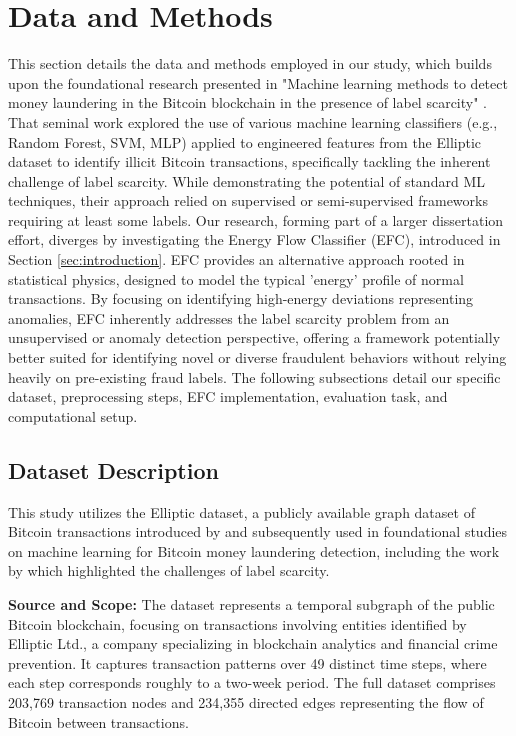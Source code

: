 \documentclass[12pt]{article}
\begin{document}
\section{Data and Methods} \label{sec:methods}
This section details the data and methods employed in our study, which builds upon the foundational research presented in
"Machine learning methods to detect money laundering in the Bitcoin blockchain in the presence of label scarcity"
\cite{lorenz2021machinelearningmethodsdetect}. That seminal work explored the use of various machine learning classifiers
(e.g., Random Forest, SVM, MLP) applied to engineered features from the Elliptic dataset to identify illicit Bitcoin transactions,
specifically tackling the inherent challenge of label scarcity. While demonstrating the potential of standard ML techniques,
their approach relied on supervised or semi-supervised frameworks requiring at least some labels. Our research, forming
part of a larger dissertation effort, diverges by investigating the Energy Flow Classifier (EFC), introduced in Section
\ref{sec:introduction}. EFC provides an alternative approach rooted in statistical physics, designed to model the typical
'energy' profile of normal transactions. By focusing on identifying high-energy deviations representing anomalies, EFC
inherently addresses the label scarcity problem from an unsupervised or anomaly detection perspective, offering a framework
potentially better suited for identifying novel or diverse fraudulent behaviors without relying heavily on pre-existing
fraud labels. The following subsections detail our specific dataset, preprocessing steps, EFC implementation, evaluation
task, and computational setup.

\subsection{Dataset Description} \label{subsec:dataset}

This study utilizes the Elliptic dataset, a publicly available graph dataset of Bitcoin transactions introduced by 
\cite{weber2019antimoneylaunderingbitcoinexperimenting} and subsequently used in foundational studies on machine
learning for Bitcoin money laundering detection, including the work by \cite{lorenz2021machinelearningmethodsdetect}
which highlighted the challenges of label scarcity.

\textbf{Source and Scope:} The dataset represents a temporal subgraph of the public Bitcoin blockchain, focusing on transactions
involving entities identified by Elliptic Ltd., a company specializing in blockchain analytics and financial crime prevention.
It captures transaction patterns over 49 distinct time steps, where each step corresponds roughly to a two-week period.
The full dataset comprises 203,769 transaction nodes and 234,355 directed edges representing the flow of Bitcoin between
transactions.
\end{document}
